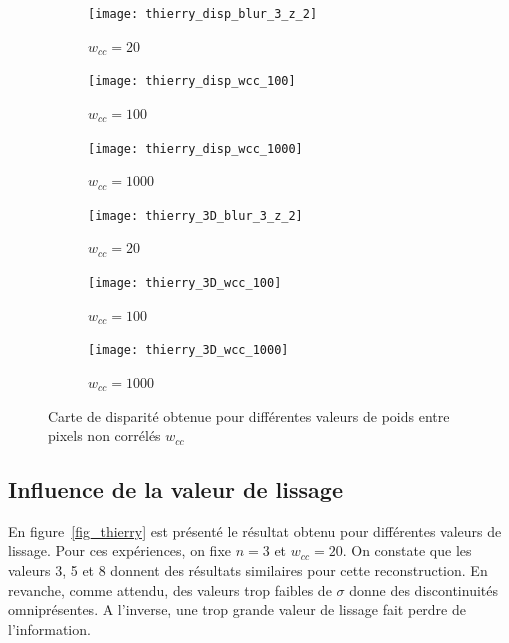 \documentclass[12pt,a4paper,onecolumn]{article}
\begin{document}
\begin{figure}[H]
	\centering
	\begin{subfigure}[b]{0.3\textwidth}
		\centering
		\texttt{[image: thierry\_disp\_blur\_3\_z\_2]}
		\caption{\(w_{cc} = 20\)}
		\label{fig_thierry_disp_wcc_20}
	\end{subfigure}
	\centering
	\begin{subfigure}[b]{0.3\textwidth}
		\centering
		\texttt{[image: thierry\_disp\_wcc\_100]}
		\caption{\(w_{cc} = 100\)}
		\label{fig_thierry_disp_wcc_100}
	\end{subfigure}
	\centering
	\begin{subfigure}[b]{0.3\textwidth}
		\centering
		\texttt{[image: thierry\_disp\_wcc\_1000]}
		\caption{\(w_{cc} = 1000\)}
		\label{fig_thierry_disp_wcc_1000}
	\end{subfigure}
	\centering
	\begin{subfigure}[b]{0.3\textwidth}
		\centering
		\texttt{[image: thierry\_3D\_blur\_3\_z\_2]}
		\caption{\(w_{cc} = 20\)}
		\label{fig_thierry_3D_wcc_20}
	\end{subfigure}
	\centering
	\begin{subfigure}[b]{0.3\textwidth}
		\centering
		\texttt{[image: thierry\_3D\_wcc\_100]}
		\caption{\(w_{cc} = 100\)}
		\label{fig_thierry_3D_wcc_100}
	\end{subfigure}
	\centering
	\begin{subfigure}[b]{0.3\textwidth}
		\centering
		\texttt{[image: thierry\_3D\_wcc\_1000]}
		\caption{\(w_{cc} = 1000\)}
		\label{fig_thierry_3D_wcc_1000}
	\end{subfigure}
	\caption{Carte de disparité obtenue pour différentes valeurs de poids entre pixels non corrélés \(w_{cc}\)}
	\label{fig_thierry_wcc}
\end{figure}


\subsection{Influence de la valeur de lissage}

En figure~\ref{fig_thierry} est présenté le résultat obtenu pour différentes valeurs de lissage. Pour ces expériences, on fixe \(n = 3\) et \(w_{cc} = 20\). On constate que les valeurs 3, 5 et 8 donnent des résultats similaires pour cette reconstruction. En revanche, comme attendu, des valeurs trop faibles de \(\sigma\) donne des discontinuités omniprésentes. A l'inverse, une trop grande valeur de lissage fait perdre de l'information.
\end{document}
